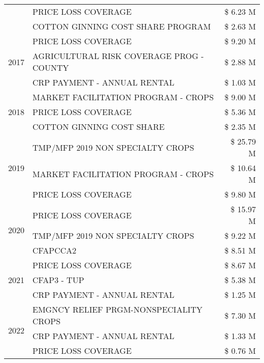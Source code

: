 \begin{tabular}{llr}
 & PRICE LOSS COVERAGE & \$ 6.23 M \\
 & COTTON GINNING COST SHARE PROGRAM & \$ 2.63 M \\
\cline{1-3}
\multirow[t]{3}{*}{2017} & PRICE LOSS COVERAGE & \$ 9.20 M \\
 & AGRICULTURAL RISK COVERAGE PROG - COUNTY & \$ 2.88 M \\
 & CRP PAYMENT - ANNUAL RENTAL & \$ 1.03 M \\
\cline{1-3}
\multirow[t]{3}{*}{2018} & MARKET FACILITATION PROGRAM - CROPS & \$ 9.00 M \\
 & PRICE LOSS COVERAGE & \$ 5.36 M \\
 & COTTON GINNING COST SHARE & \$ 2.35 M \\
\cline{1-3}
\multirow[t]{3}{*}{2019} & TMP/MFP 2019 NON SPECIALTY CROPS & \$ 25.79 M \\
 & MARKET FACILITATION PROGRAM - CROPS & \$ 10.64 M \\
 & PRICE LOSS COVERAGE & \$ 9.80 M \\
\cline{1-3}
\multirow[t]{3}{*}{2020} & PRICE LOSS COVERAGE & \$ 15.97 M \\
 & TMP/MFP 2019 NON SPECIALTY CROPS & \$ 9.22 M \\
 & CFAPCCA2 & \$ 8.51 M \\
\cline{1-3}
\multirow[t]{3}{*}{2021} & PRICE LOSS COVERAGE & \$ 8.67 M \\
 & CFAP3 - TUP & \$ 5.38 M \\
 & CRP PAYMENT - ANNUAL RENTAL & \$ 1.25 M \\
\cline{1-3}
\multirow[t]{3}{*}{2022} & EMGNCY RELIEF PRGM-NONSPECIALITY CROPS & \$ 7.30 M \\
 & CRP PAYMENT - ANNUAL RENTAL & \$ 1.33 M \\
 & PRICE LOSS COVERAGE & \$ 0.76 M \\
\cline{1-3}
\bottomrule
\end{tabular}
